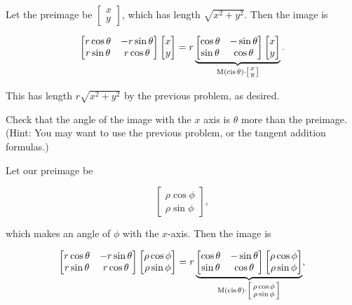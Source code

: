 \documentclass[../gatm_answers.tex]{subfiles}
\begin{document}
Let the preimage be $\begin{bmatrix} x \\ y \end{bmatrix}$, which has length $\sqrt{x^2+y^2}$. Then the image is

$$\begin{bmatrix} r\cos\theta & -r\sin\theta \\ r\sin\theta & r\cos\theta \end{bmatrix}\begin{bmatrix} x \\ y \end{bmatrix} = r \underbrace{\begin{bmatrix} \cos\theta & -\sin\theta \\ \sin\theta & \cos\theta \end{bmatrix} \begin{bmatrix} x \\ y \end{bmatrix}}_{\operatorname{M}(\operatorname{cis}\theta)\cdot \left[\begin{smallmatrix} x \\ y \end{smallmatrix}\right]}.$$

This has length $r\sqrt{x^2+y^2}$ by the previous problem, as desired.

\begin{iinner_problem}
\item Check that the angle of the image with the $x$ axis is $\theta$ more than the preimage. (Hint: You may want to use the previous problem, or the tangent addition formulas.)
\end{iinner_problem}

Let our preimage be

$$\begin{bmatrix}\rho \cos\phi \\ \rho \sin\phi \end{bmatrix},$$

which makes an angle of $\phi$ with the $x$-axis. Then the image is

$$\begin{bmatrix} r\cos\theta & -r\sin\theta \\ r\sin\theta & r\cos\theta \end{bmatrix} \begin{bmatrix}\rho \cos\phi \\ \rho \sin\phi \end{bmatrix} = r\underbrace{\begin{bmatrix} \cos\theta & -\sin\theta \\ \sin\theta & \cos\theta \end{bmatrix} \begin{bmatrix}\rho \cos\phi \\ \rho \sin\phi \end{bmatrix}}_{\operatorname{M}(\operatorname{cis}\theta) \cdot \left[\begin{smallmatrix} \rho \cos\phi \\ \rho \sin\phi \end{smallmatrix} \right]},$$
\end{document}
